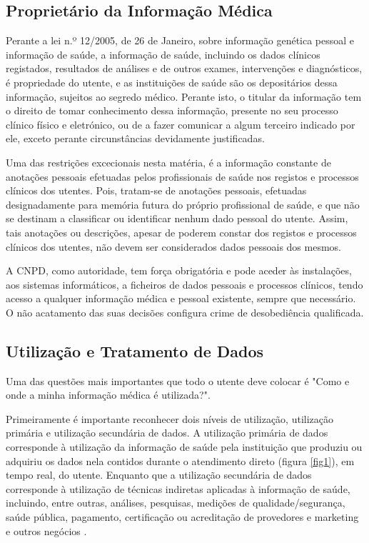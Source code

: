 \documentclass[conference]{IEEEtran}
\begin{document}
\subsection{Proprietário da Informação Médica}

Perante a lei n.º 12/2005, de 26 de Janeiro, sobre informação genética pessoal e informação de saúde, a informação de saúde, incluindo os dados clínicos registados, resultados de análises e de outros exames, intervenções e diagnósticos, é propriedade do utente, e as instituições de saúde são os depositários dessa informação, sujeitos ao segredo médico. Perante isto, o titular da informação tem o direito de tomar conhecimento dessa informação, presente no seu processo clínico físico e eletrónico, ou de a fazer comunicar a algum terceiro indicado por ele, exceto perante circunstâncias devidamente justificadas.

Uma das restrições excecionais nesta matéria, é a informação constante de anotações pessoais efetuadas pelos profissionais de saúde nos registos e processos clínicos dos utentes.
Pois, tratam-se de anotações pessoais, efetuadas designadamente para memória futura do próprio profissional de saúde, e que não se destinam a classificar ou identificar nenhum dado pessoal do utente.
Assim, tais anotações ou descrições, apesar de poderem constar dos registos e processos clínicos dos utentes, não devem ser considerados dados pessoais dos mesmos.

A CNPD, como autoridade, tem força obrigatória e pode aceder às instalações, aos sistemas informáticos, a ficheiros de dados pessoais e processos clínicos, tendo acesso a qualquer informação médica e pessoal existente, sempre que necessário. O não acatamento das suas decisões configura crime de desobediência qualificada.


\subsection{Utilização e Tratamento de Dados}

Uma das questões mais importantes que todo o utente deve colocar é "Como e onde a minha informação médica é utilizada?".

Primeiramente é importante reconhecer dois níveis de utilização, utilização primária e utilização secundária de dados. A utilização primária de dados corresponde à utilização da informação de saúde pela instituição que produziu ou adquiriu os dados nela contidos durante o atendimento direto (figura \ref{fig1}), em tempo real, do utente. Enquanto que a utilização secundária de dados corresponde à utilização de técnicas indiretas aplicadas à informação de saúde, incluindo, entre outras, análises, pesquisas, medições de qualidade/segurança, saúde pública, pagamento, certificação ou acreditação de provedores e marketing e outros negócios \cite{safran2007toward}.
\end{document}
